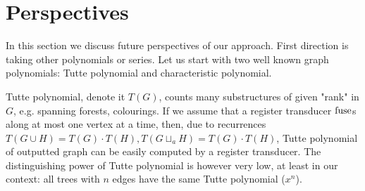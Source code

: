 \section{Perspectives}
In this section we discuss future perspectives of our approach. First direction is taking other polynomials or series. Let us start with two well known graph polynomials: Tutte polynomial and characteristic polynomial.

Tutte polynomial, denote it $T(G)$, counts many substructures of given "rank" in $G$, e.g. spanning forests, colourings. If we assume that a register transducer $\operatorname{fuse}$s along at most one vertex at a time, then, due to recurrences $T(G \cup H) = T(G) \cdot T(H), T(G\sqcup_a H) = T(G) \cdot T(H)$, Tutte polynomial of outputted graph can be easily computed by a register transducer. The distinguishing power of Tutte polynomial is however very low, at least in our context: all trees with $n$ edges have the same Tutte polynomial ($x^n$).

